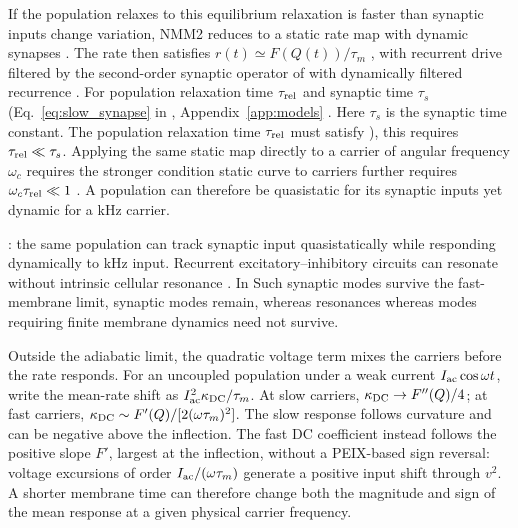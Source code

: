 \documentclass[11pt,a4paper]{article}
\providecommand{\DIFaddtex}[1]{{\protect\color{blue} \sf #1}} %
\providecommand{\DIFdeltex}[1]{{\protect\color{red} \scriptsize #1}} %
\providecommand{\DIFaddbegin}{} %
\providecommand{\DIFaddend}{} %
\providecommand{\DIFdelbegin}{} %
\providecommand{\DIFdelend}{} %
\providecommand{\DIFadd}[1]{\texorpdfstring{\DIFaddtex{#1}}{#1}} %
\providecommand{\DIFdel}[1]{\texorpdfstring{\DIFdeltex{#1}}{}} %
\begin{document}
If \DIFdelbegin \DIFdel{the population relaxes to this equilibrium }\DIFdelend \DIFaddbegin \DIFadd{relaxation is }\DIFaddend faster than synaptic \DIFdelbegin \DIFdel{inputs change}\DIFdelend \DIFaddbegin \DIFadd{variation}\DIFaddend , NMM2 reduces to
\DIFdelbegin \DIFdel{a static rate map with dynamic synapses
\cite{ruffini2021nmm2,clusella2023}. The rate then satisfies }\DIFdelend $r(t)\simeq F(Q(t))/\tau_m$ \DIFdelbegin \DIFdel{, with recurrent drive
filtered by the second-order synaptic operator of }\DIFdelend \DIFaddbegin \DIFadd{with dynamically filtered recurrence
\cite{ruffini2021nmm2,clusella2023}. For population relaxation time
$\tau_{\rm rel}$ and synaptic time $\tau_s$ (}\DIFaddend Eq.~\eqref{eq:slow_synapse}\DIFdelbegin \DIFdel{in }\DIFdelend \DIFaddbegin \DIFadd{,
}\DIFaddend Appendix~\ref{app:models}\DIFdelbegin \DIFdel{.
Here $\tau_s$ is the synaptic time constant. The population relaxation time
$\tau_{\rm rel}$ must satisfy }\DIFdelend \DIFaddbegin \DIFadd{), this requires }\DIFaddend $\tau_{\rm rel}\ll\tau_s$.
Applying the \DIFdelbegin \DIFdel{same static map directly to a
carrier of angular frequency $\omega_c$ requires
the stronger condition
}\DIFdelend \DIFaddbegin \DIFadd{static curve to carriers further requires
}\DIFaddend $\omega_c\tau_{\rm rel}\ll1$\DIFdelbegin \DIFdel{. A population can therefore be quasistatic for its
synaptic
inputs yet dynamic for a kHz carrier.
}%

\DIFdelend \DIFaddbegin \DIFadd{: the same population can track synaptic
input quasistatically while responding dynamically to kHz input.
}\DIFaddend Recurrent excitatory--inhibitory circuits \DIFdelbegin \DIFdel{can }\DIFdelend resonate without intrinsic
cellular resonance \cite{brunelhakim1999,brunelwang2003}. \DIFdelbegin \DIFdel{In }\DIFdelend \DIFaddbegin \DIFadd{Such synaptic
modes survive }\DIFaddend the fast-membrane limit, \DIFdelbegin \DIFdel{synaptic modes remain, whereas resonances }\DIFdelend \DIFaddbegin \DIFadd{whereas modes }\DIFaddend requiring finite
membrane dynamics need not\DIFdelbegin \DIFdel{survive}\DIFdelend .

Outside the adiabatic limit, the quadratic voltage term mixes the carriers
before the rate responds. For an uncoupled population under a weak current
$I_{\rm ac}\cos\omega t$, write the mean-rate shift as
$I_{\rm ac}^2\kappa_{\rm DC}/\tau_m$. At slow carriers,
$\kappa_{\rm DC}\to F''(Q)/4$; at fast carriers,
$\kappa_{\rm DC}\sim F'(Q)/[2(\omega\tau_m)^2]$.
The slow response follows curvature and can be negative above the inflection.
The fast DC coefficient instead follows the positive slope $F'$, largest at the
inflection, without a PEIX-based sign reversal: voltage excursions of order
$I_{\rm ac}/(\omega\tau_m)$ generate a positive input shift through $v^2$.
A shorter membrane time can therefore change both the magnitude and sign
of the mean response at a given physical carrier frequency.
\end{document}
